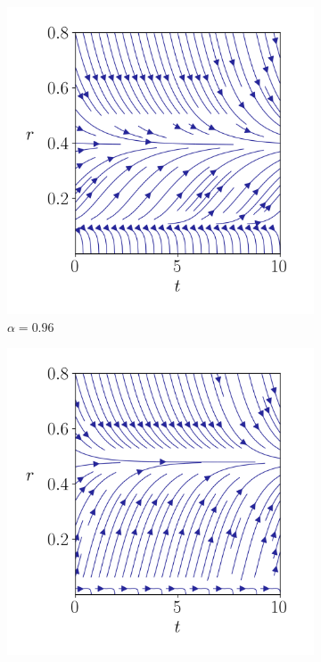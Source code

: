 \begin{figure}
    \begin{subfigure}[b]{0.48\linewidth}
    \centering
        \includegraphics[width=\linewidth]{figures/streamlines/mod1-a96.png}
        \caption{$\alpha=0.96$} 
        \label{fig:radius-characteristics-96} 
    \end{subfigure}
    \begin{subfigure}[b]{0.48\linewidth}
    \centering
        \includegraphics[width=\linewidth]{figures/streamlines/mod1-a99.png}

\end{subfigure}
\end{figure}
